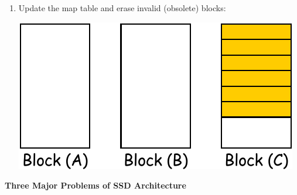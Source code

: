 \begin{examplebox}
\begin{enumerate}
        \item Update the map table and erase invalid (obsolete) blocks:
        \begin{center}
            \includegraphics[width=.4\textwidth]{img/garbage-collection-5.pdf}
        \end{center}
    \end{enumerate}
\end{examplebox}

\begin{flushleft}
    \textcolor{Red2}{ \textbf{Three Major Problems of SSD Architecture}}
\end{flushleft}
